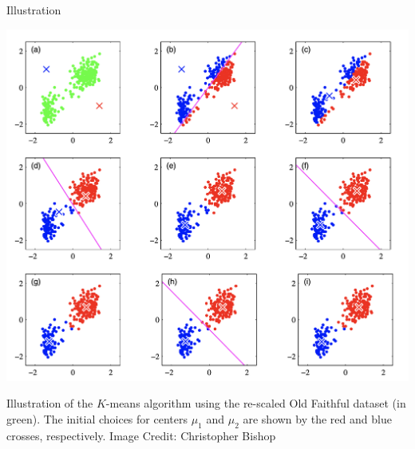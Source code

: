 \documentclass[10pt]{beamer}
\begin{document}
\begin{frame}{Illustration}
\begin{center}
\includegraphics[width=.7\textwidth]{images/k_means}
\end{center}
\footnotesize Illustration of the  $K$-means algorithm using the re-scaled Old Faithful dataset (in green).  The initial choices for centers $\mu_1$ and $\mu_2$ are shown by the red and blue crosses, respectively.
\vfill
\hfill \tiny Image Credit: Christopher Bishop
\end{frame}
\end{document}
